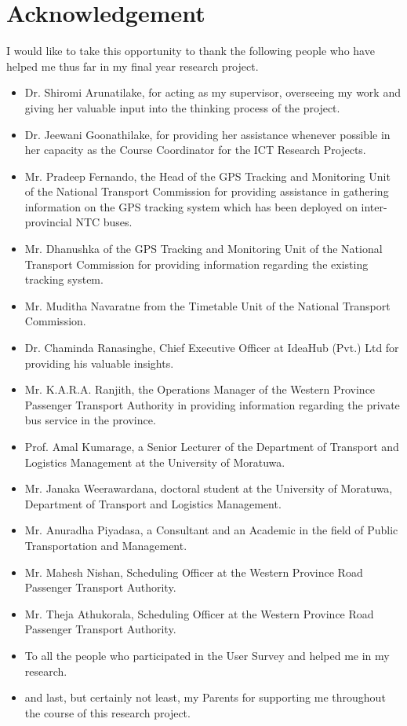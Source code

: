 \documentclass[12pt, oneside]{report}
\begin{document}
\section*{Acknowledgement}
I would like to take this opportunity to thank the following people who have helped me thus far in my final year research project.
\begin{itemize}
\item Dr. Shiromi Arunatilake, for acting as my supervisor, overseeing my work and giving her valuable input into the thinking process of the project.
\item Dr. Jeewani Goonathilake, for providing her assistance whenever possible in her capacity as the Course Coordinator for the ICT Research Projects.
\item Mr. Pradeep Fernando, the Head of the GPS Tracking and Monitoring Unit of the National Transport Commission for providing assistance in gathering information on the GPS tracking system which has been deployed on inter-provincial NTC buses.
\item Mr. Dhanushka of the GPS Tracking and Monitoring Unit of the National Transport Commission for providing information regarding the existing tracking system.
\item Mr. Muditha Navaratne from the Timetable Unit of the National Transport Commission.
\item Dr. Chaminda Ranasinghe, Chief Executive Officer at IdeaHub (Pvt.) Ltd for providing his valuable insights.
\item Mr. K.A.R.A. Ranjith, the Operations Manager of the Western Province Passenger Transport Authority in providing information regarding the private bus service in the province.
\item Prof. Amal Kumarage, a Senior Lecturer of the Department of Transport and Logistics Management at the University of Moratuwa.
\item Mr. Janaka Weerawardana, doctoral student at the University of Moratuwa, Department of Transport and Logistics Management.
\item Mr. Anuradha Piyadasa, a Consultant and an Academic in the field of Public Transportation and Management.
\item Mr. Mahesh Nishan, Scheduling Officer at the Western Province Road Passenger Transport Authority.
\item Mr. Theja Athukorala, Scheduling Officer at the Western Province Road Passenger Transport Authority.
\item To all the people who participated in the User Survey and helped me in my research.
\item and last, but certainly not least, my Parents for supporting me throughout the course of this research project.
\end{itemize}
\end{document}
